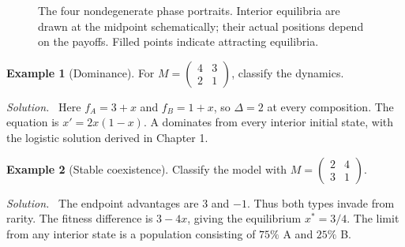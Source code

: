 \documentclass[11pt,oneside,openany]{book}
\theoremstyle{definition}
\newtheorem{example}{Example}[chapter]
\theoremstyle{remark}
\newenvironment{solution}{\par\smallskip\noindent\textit{Solution.}\ }{\par\smallskip}
\numberwithin{equation}{chapter}
\begin{document}
\begin{figure}[htbp]
\centering
{}
\caption{The four nondegenerate phase portraits. Interior equilibria are drawn at the midpoint schematically; their actual positions depend on the payoffs. Filled points indicate attracting equilibria.}
\end{figure}

\begin{example}[Dominance]
For $M=\left(\begin{smallmatrix}4&3\\2&1\end{smallmatrix}\right)$, classify the dynamics.
\begin{solution}
Here $f_A=3+x$ and $f_B=1+x$, so $\Delta=2$ at every composition. The equation is $x'=2x(1-x)$. A dominates from every interior initial state, with the logistic solution derived in Chapter 1.
\end{solution}
\end{example}

\begin{example}[Stable coexistence]
Classify the model with $M=\left(\begin{smallmatrix}2&4\\3&1\end{smallmatrix}\right)$.
\begin{solution}
The endpoint advantages are $3$ and $-1$. Thus both types invade from rarity. The fitness difference is $3-4x$, giving the equilibrium $x^*=3/4$. The limit from any interior state is a population consisting of $75\%$ A and $25\%$ B.
\end{solution}
\end{example}
\end{document}

